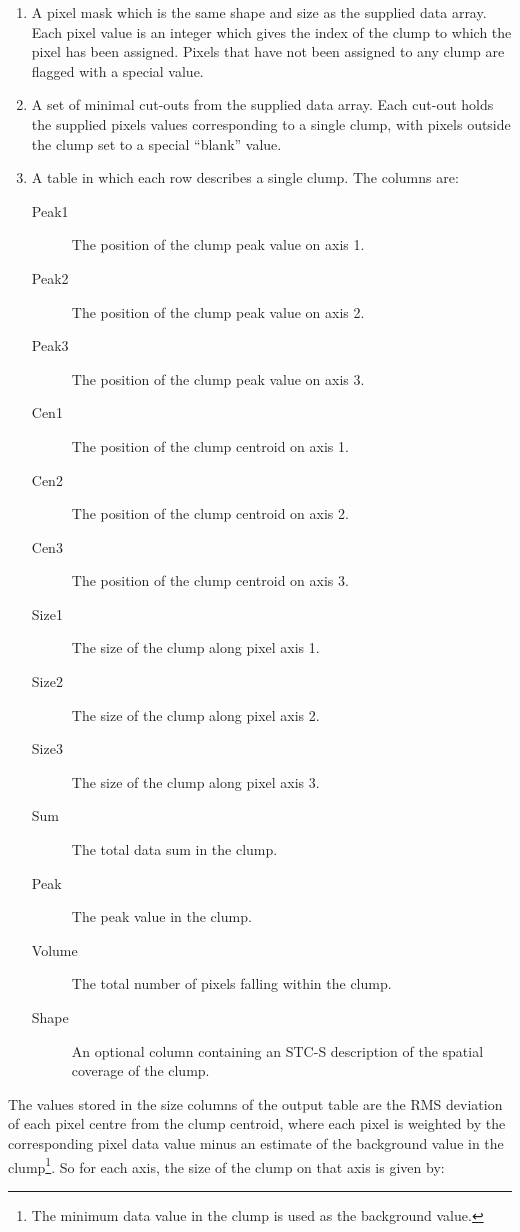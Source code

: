 \documentclass[final,authoryear,5p,times,twocolumn]{elsarticle}
\begin{document}
\begin{enumerate}

\item A pixel mask which is the same shape and size as the supplied data
array. Each pixel value is an integer which gives the index of the clump
to which the pixel has been assigned. Pixels that have not been assigned
to any clump are flagged with a special value.

\item A set of minimal cut-outs from the supplied data array. Each cut-out
holds the supplied pixels values corresponding to a single clump, with pixels
outside the clump set to a special ``blank'' value.

\item A table in which each row describes a single clump. The columns are:

\begin{description}
\item[Peak1] The position of the clump peak value on axis 1.
\item[Peak2] The position of the clump peak value on axis 2.
\item[Peak3] The position of the clump peak value on axis 3.
\item[Cen1] The position of the clump centroid on axis 1.
\item[Cen2] The position of the clump centroid on axis 2.
\item[Cen3] The position of the clump centroid on axis 3.
\item[Size1] The size of the clump along pixel axis 1.
\item[Size2] The size of the clump along pixel axis 2.
\item[Size3] The size of the clump along pixel axis 3.
\item[Sum] The total data sum in the clump.
\item[Peak] The peak value in the clump.
\item[Volume] The total number of pixels falling within the clump.
\item[Shape] An optional column containing an STC-S description
\citep{2007STCS,2007STC,2010ASPC..434..213B} of the spatial coverage of the clump.
\end{description}

\end{enumerate}

The values stored in the size columns of the output table are the RMS
deviation of each pixel centre from the clump centroid, where each pixel
is weighted by the corresponding pixel data value minus an estimate of
the background value in the clump\footnote{The minimum data value in the
clump is used as the background value.}. So for each axis, the size of
the clump on that axis is given by:
\end{document}
